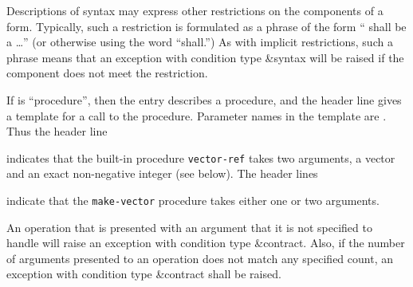 Descriptions of syntax may express other restrictions on the
components of a form.  Typically, such a restriction is formulated
as a phrase of the form `` shall be a \ldots'' (or otherwise
using the word ``shall.'')  As with
implicit restrictions, such a phrase means that an exception with
condition type {\cf\&syntax} will be raised if the component does not
meet the restriction.


If  is ``procedure'', then the entry describes a procedure, and
the header line gives a template for a call to the procedure.  Parameter
names in the template are .  Thus the header line

\noindent{}\unpenalty

indicates that the built-in procedure {\tt vector-ref} takes
two arguments, a vector  and an exact non-negative integer
 (see below).  The header lines

\noindent%
\unpenalty

indicate that the {\tt make-vector} procedure takes
either one or two arguments.

\label{typeconventions}
An operation that is presented with an argument that it is not
specified to handle will raise an exception with condition type
{\cf\&contract}.  Also, if the number of arguments presented to an
operation does not match any specified count, an exception with
condition type {\cf\&contract} shall be raised.

